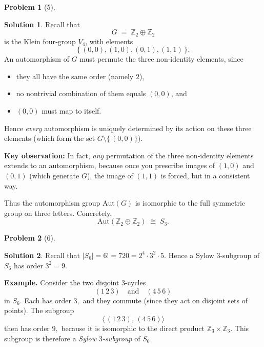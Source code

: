 \documentclass[12pt]{article}
\theoremstyle{definition} %
\newtheorem{solution}{Solution}
\newtheorem{problem}{Problem}
\theoremstyle{plain} %
\begin{document}
\begin{problem}[5]
    
\end{problem}
\begin{solution}
    Recall that 
    \[
    G \;=\;\mathbb{Z}_2 \oplus \mathbb{Z}_2
    \]
    is the Klein four‐group $V_4$, with elements
    \[
    \{\, (0,0), (1,0), (0,1), (1,1)\,\}.
    \]
    An automorphism of $G$ must permute the three non‐identity elements, since
    \begin{itemize}
    \item they all have the same order (namely $2$),
    \item no nontrivial combination of them equals $(0,0)$, and
    \item $(0,0)$ must map to itself.
    \end{itemize}
    Hence \emph{every} automorphism is uniquely determined by its action on these three elements (which form the set $G\setminus\{\,(0,0)\}$).
    
    \medskip
    
    \noindent
    \textbf{Key observation:}  In fact, \emph{any} permutation of the three non‐identity elements extends to an automorphism, because once you prescribe images of $(1,0)$ and $(0,1)$ (which generate $G$), the image of $(1,1)$ is forced, but in a consistent way.  
    
    Thus the automorphism group $\mathrm{Aut}(G)$ is isomorphic to the full symmetric group on three letters.  Concretely,
    \[
    \mathrm{Aut}(\mathbb{Z}_2 \oplus \mathbb{Z}_2)
    \;\cong\; S_3.
    \] 
\end{solution}
\begin{problem}[6]
    
\end{problem}
\begin{solution}
    Recall that $\lvert S_6\rvert = 6! = 720 = 2^4 \cdot 3^2 \cdot 5.$ Hence a Sylow $3$-subgroup of $S_6$ has order $3^2 = 9.$

\medskip

\noindent
\textbf{Example.} Consider the two disjoint $3$-cycles
\[
(1\,2\,3)
\quad\text{and}\quad
(4\,5\,6)
\]
in $S_6.$ Each has order $3,$ and they commute (since they act on disjoint sets of points). The subgroup
\[
\langle\,(1\,2\,3),\,(4\,5\,6)\rangle
\]
then has order $9,$ because it is isomorphic to the direct product $\mathbb{Z}_3 \times \mathbb{Z}_3.$ This subgroup is therefore a \emph{Sylow $3$-subgroup} of $S_6$.

\end{solution}
\end{document}
